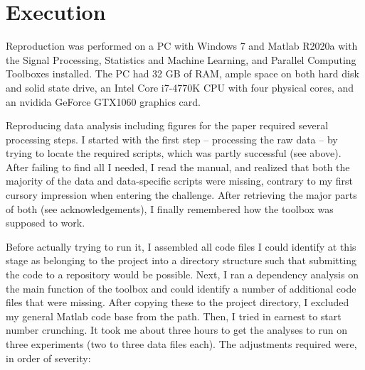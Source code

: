 \section{Execution}

Reproduction was performed on a PC with Windows 7 and Matlab R2020a with the Signal Processing, Statistics and Machine Learning, and Parallel Computing Toolboxes installed. The PC had 32 GB of RAM, ample space on both hard disk and solid state drive, an Intel Core i7-4770K CPU with four physical cores, and an nvidida GeForce GTX1060 graphics card.

Reproducing data analysis including figures for the paper required several processing steps. 
I started with the first step -- processing the raw data -- by trying to locate the required scripts, which was partly successful (see above). After failing to find all I needed, I read the manual, and realized that both the majority of the data and data-specific scripts were missing, contrary to my first cursory impression when entering the challenge. After retrieving the major parts of both (see acknowledgements), I finally remembered how the toolbox was supposed to work.

Before actually trying to run it, I assembled all code files I could identify at this stage as belonging to the project into a directory structure such that submitting the code to a repository would be possible. Next, I ran a dependency analysis on the main function of the toolbox and could identify a number of additional code files that were missing. After copying these to the project directory, I excluded my general Matlab code base from the path. Then, I tried in earnest to start number crunching. It took me about three hours to get the analyses to run on three experiments (two to three data files each). The adjustments required were, in order of severity:

